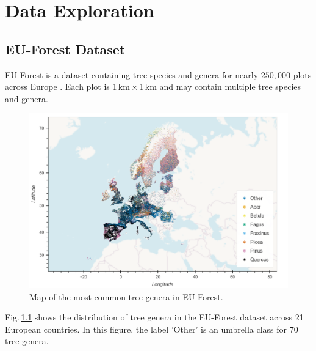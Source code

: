 \chapter{Data Exploration}
\label{chapter:data}
\section{EU-Forest Dataset}

EU-Forest is a dataset containing tree species and genera for nearly
$250,000$ plots across Europe \cite{eu_forest_data}. Each plot is 1\,km\,×\,1\,km
and may contain multiple tree species and genera.

\begin{figure}[!htb]
    \centering
    \includegraphics[width=0.9\linewidth]{figures_labels/genus_cutoff_map.png}
    \caption{Map of the most common tree genera in EU-Forest.}
    \label{fig:genus_cutoff_map}
\end{figure}

Fig.\,\ref{fig:genus_cutoff_map} shows the distribution of tree genera in the EU-Forest dataset
across 21 European countries. In this figure, the label 'Other' is an umbrella class for 70 
tree genera.

